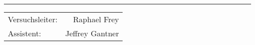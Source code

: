 \begin{titlepage}

    \maketitle

    \vspace{110mm}

    \rule{\textwidth}{0.4pt}
    \Huge
    \begin{center}
    \begin{tabular}{lr}

        Versuchsleiter: & Raphael Frey \\
        Assistent: & Jeffrey Gantner \\

    \end{tabular}
    \end{center}
    \normalsize

\end{titlepage}
